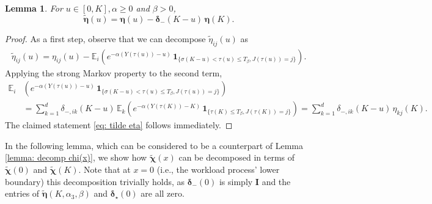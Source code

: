 \documentclass[reqno,12pt]{amsart}
\newcommand{\bs}{\boldsymbol}
\newtheorem{lemma}{Lemma}
\begin{document}
{\begin{lemma}\label{lemma: eta tilde}
    For $u\in[0,K], \alpha \geqslant 0$ and $\beta>0$,
    \begin{equation}\label{eq: tilde eta}
        \tilde{\bs \eta}(u) = \bs{\eta}(u) - \bs{\delta}_{-}(K-u)\,\bs{\eta}(K).
    \end{equation}
\end{lemma}
\begin{proof}
    As a  first step, observe that we can decompose $\tilde{\eta}_{ij}(u)$ as
    \begin{align*}
        \tilde{\eta}_{ij}(u) =\eta_{ij}(u) - {\mathbb E}_{i}\left(e^{-\alpha \left(Y(\tau(u)) - u\right)}\,\bs{1}_{\{\sigma(K-u) < \tau(u) \leqslant T_{\beta}, J(\tau(u)) = j\}}\right).
    \end{align*}
    Applying the strong Markov property to the second term,
    \begin{align*}
        {\mathbb E}_{i}&\left(e^{-\alpha \left(Y(\tau(u)) - u\right)}\,\bs{1}_{\{\sigma(K-u) < \tau(u) \leqslant T_{\beta}, J(\tau(u)) = j\}}\right) \\
        &= \sum_{k=1}^d\delta_{-,ik}(K-u)\,{\mathbb E}_{k}\left(e^{-\alpha \left(Y(\tau(K)) - K\right)}\,\bs{1}_{\{\tau(K) \leqslant T_{\beta}, J(\tau(K)) = j\}}\right) = \sum_{k=1}^d\delta_{-,ik}(K-u)\,\eta_{kj}(K).
    \end{align*}
    The claimed statement \eqref{eq: tilde eta} follows immediately.
\end{proof}

In the following lemma, which can be considered to be a counterpart of Lemma \ref{lemma: decomp chi(x)}, we show how $\tilde{\bs \chi}(x)$ can be decomposed in terms of $\tilde{\bs \chi}(0)$ and $\tilde{\bs \chi}(K)$. Note that at $x=0$ (i.e., the workload process' lower boundary) this decomposition trivially holds, as ${\bs \delta_-(0)}$ is simply ${\bs I}$ and the entries of $\tilde{\bs \eta}(K, \alpha_3, \beta)$ and $\bs\delta_{\star}(0)$ are all zero. 

}
\end{document}
